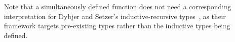 \documentclass[a4paper,UKenglish,numberwithinsect,cleveref,thm-restate]{lipics-v2021}
\begin{document}

\begin{remark} \label{re:method-recursion-IIR}
Note that a simultaneously defined function does not need a corresponding interpretation for Dybjer and Setzer's inductive-recursive types~\cite{Dybjer1999}, as their framework targets pre-existing types rather than the inductive types being defined.
\end{remark}
\end{document}

